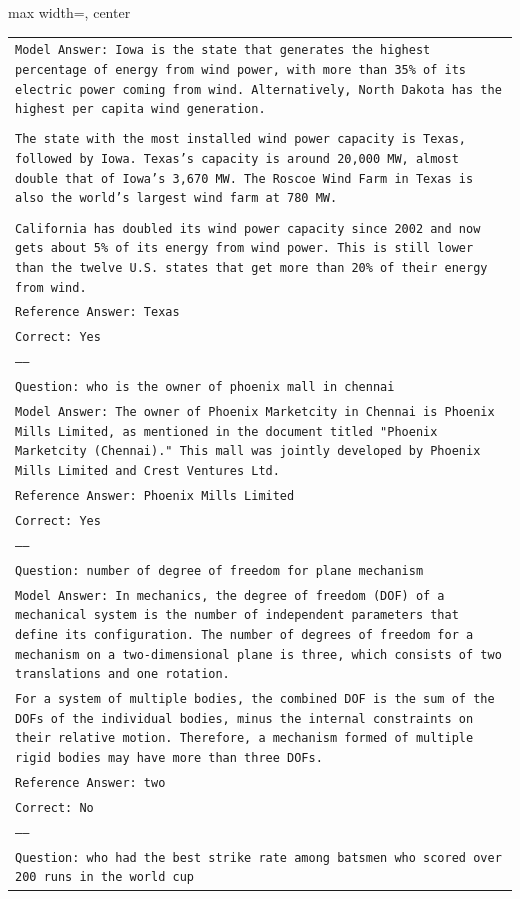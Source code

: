 \documentclass[11pt]{article}
\begin{document}
\begin{table}[ht]
\begin{adjustbox}{max width=\textwidth, center}
\begin{tabular}{>{\raggedright\arraybackslash\tt}p{}<{}}
Model Answer: Iowa is the state that generates the highest percentage of energy from wind power, with more than 35\% of its electric power coming from wind. Alternatively, North Dakota has the highest per capita wind generation. \\
\\
The state with the most installed wind power capacity is Texas, followed by Iowa. Texas's capacity is around 20,000 MW, almost double that of Iowa's 3,670 MW. The Roscoe Wind Farm in Texas is also the world's largest wind farm at 780 MW. \\
\\
California has doubled its wind power capacity since 2002 and now gets about 5\% of its energy from wind power. This is still lower than the twelve U.S. states that get more than 20\% of their energy from wind.\\
Reference Answer: Texas\\
Correct: Yes\\
-----\\
Question: who is the owner of phoenix mall in chennai\\
Model Answer: The owner of Phoenix Marketcity in Chennai is Phoenix Mills Limited, as mentioned in the document titled "Phoenix Marketcity (Chennai)." This mall was jointly developed by Phoenix Mills Limited and Crest Ventures Ltd.\\
Reference Answer: Phoenix Mills Limited\\
Correct: Yes\\
-----\\
Question: number of degree of freedom for plane mechanism\\
Model Answer: In mechanics, the degree of freedom (DOF) of a mechanical system is the number of independent parameters that define its configuration. The number of degrees of freedom for a mechanism on a two-dimensional plane is three, which consists of two translations and one rotation. 
\\
For a system of multiple bodies, the combined DOF is the sum of the DOFs of the individual bodies, minus the internal constraints on their relative motion. Therefore, a mechanism formed of multiple rigid bodies may have more than three DOFs.\\
Reference Answer: two\\
Correct: No\\
-----\\
Question: who had the best strike rate among batsmen who scored over 200 runs in the world cup\\

\end{tabular}
\end{adjustbox}
\end{table}
\end{document}
